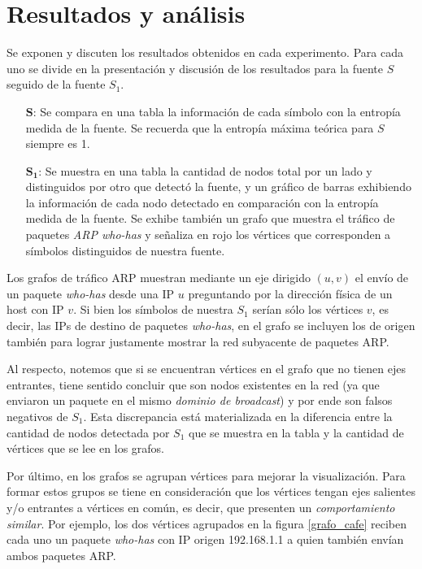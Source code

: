 \section{Resultados y análisis}

Se exponen y discuten los resultados obtenidos en cada experimento. Para cada uno se divide en la presentación y discusión de los resultados para la fuente $S$ seguido de la fuente $S_1$.

\begin{itemize}
	\item[$\mathbf{S}$:\space] Se compara en una tabla la información de cada símbolo con la entropía medida de la fuente. Se recuerda que la entropía máxima teórica para $S$ siempre es 1.
	\item[$\mathbf{S_1}$:] Se muestra en una tabla la cantidad de nodos total por un lado y distinguidos por otro que detectó la fuente, y un gráfico de barras exhibiendo la información de cada nodo detectado en comparación con la entropía medida de la fuente. Se exhibe también un grafo que muestra el tráfico de paquetes \textit{ARP who-has} y señaliza en rojo los vértices que corresponden a símbolos distinguidos de nuestra fuente. 
\end{itemize}

\medskip

Los grafos de tráfico ARP muestran mediante un eje dirigido $(u,v)$ el envío de un paquete \textit{who-has} desde una IP $u$ preguntando por la dirección física de un host con IP $v$. Si bien los símbolos de nuestra $S_1$ serían sólo los vértices $v$, es decir, las IPs de destino de paquetes \textit{who-has}, en el grafo se incluyen los de origen también para lograr justamente mostrar la red subyacente de paquetes ARP.

Al respecto, notemos que si se encuentran vértices en el grafo que no tienen ejes entrantes, tiene sentido concluir que son nodos existentes en la red (ya que enviaron un paquete en el mismo \textit{dominio de broadcast}) y por ende son falsos negativos de $S_1$. Esta discrepancia está materializada en la diferencia entre la cantidad de nodos detectada por $S_1$ que se muestra en la tabla y la cantidad de vértices que se lee en los grafos.

Por último, en los grafos se agrupan vértices para mejorar la visualización. Para formar estos grupos se tiene en consideración que los vértices tengan ejes salientes y/o entrantes a vértices en común, es decir, que presenten un \textit{comportamiento similar}. Por ejemplo, los dos vértices agrupados en la figura \ref{grafo_cafe} reciben cada uno un paquete \textit{who-has} con IP origen 192.168.1.1 a quien también envían ambos paquetes ARP.

